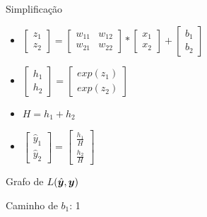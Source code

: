 \documentclass[10pt]{beamer}
\begin{document}
\begin{frame}{Simplificação}
\Large{
\begin{itemize}
\item $\begin{bmatrix}z_1\\z_2\end{bmatrix} = \begin{bmatrix}w_{11}  & w_{12}\\w_{21}  & w_{22}\end{bmatrix}* \begin{bmatrix}x_1\\x_2\end{bmatrix} + \begin{bmatrix}b_1\\b_2\end{bmatrix}$

\vspace{0.4cm}

\item $\begin{bmatrix}h_1\\h_2\end{bmatrix} = \begin{bmatrix}exp(z_1)\\exp(z_2)\end{bmatrix}$ 

\vspace{0.4cm}

\item $H = h_1 + h_2$ 

\vspace{0.4cm}

\item $\begin{bmatrix}\hat{y}_1\\\hat{y}_2\end{bmatrix} = \begin{bmatrix}\frac{h_1}{H}\\\frac{h_2}{H}\end{bmatrix}$ 
\end{itemize}
}
\end{frame}



\begin{frame}{Grafo de $L(\hat{\bm{y}}, \bm{y})$}

\end{frame}

\begin{frame}{Caminho de $b_1$: 1}

\end{frame}
\end{document}
